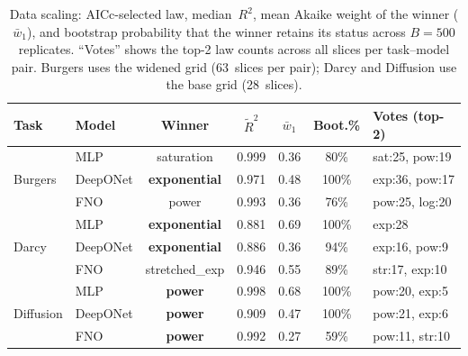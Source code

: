 \documentclass[11pt]{article}
\begin{document}
\begin{table}[h]
\centering
\caption{Data scaling: AICc-selected law, median~$R^2$,
mean Akaike weight of the winner ($\bar{w}_1$), and bootstrap
probability that the winner retains its status across $B\!=\!500$
replicates. ``Votes'' shows the top-2 law counts across all
slices per task--model pair. Burgers uses the widened grid
(63~slices per pair); Darcy and Diffusion use the base grid
(28~slices).}
\label{tab:data-laws}
\begin{tabular}{@{}llccccl@{}}
\toprule
\textbf{Task} & \textbf{Model} & \textbf{Winner} & $\tilde{R}^2$ &
$\bar{w}_1$ & \textbf{Boot.\%} & \textbf{Votes (top-2)} \\
\midrule
\multirow{3}{*}{Burgers}
  & MLP      & saturation  & 0.999 & 0.36 & 80\% & sat:25, pow:19 \\
  & DeepONet & \textbf{exponential} & 0.971 & 0.48 & 100\% & exp:36, pow:17 \\
  & FNO      & power       & 0.993 & 0.36 & 76\% & pow:25, log:20 \\
\midrule
\multirow{3}{*}{Darcy}
  & MLP      & \textbf{exponential} & 0.881 & 0.69 & 100\% & exp:28 \\
  & DeepONet & \textbf{exponential} & 0.886 & 0.36 & 94\% & exp:16, pow:9 \\
  & FNO      & stretched\_exp & 0.946 & 0.55 & 89\% & str:17, exp:10 \\
\midrule
\multirow{3}{*}{Diffusion}
  & MLP      & \textbf{power} & 0.998 & 0.68 & 100\% & pow:20, exp:5 \\
  & DeepONet & \textbf{power} & 0.909 & 0.47 & 100\% & pow:21, exp:6 \\
  & FNO      & \textbf{power} & 0.992 & 0.27 & 59\% & pow:11, str:10 \\
\bottomrule
\end{tabular}
\vspace{2pt}

\end{table}
\end{document}
